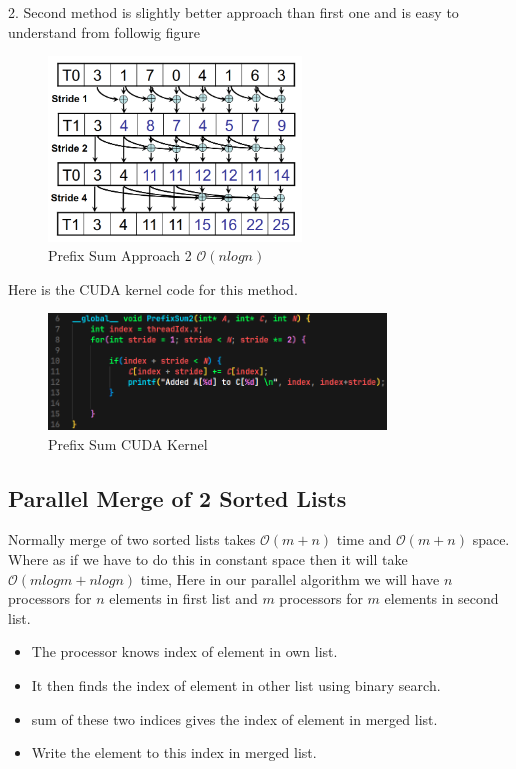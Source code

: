 \documentclass{article}
\begin{document}
2. Second method is slightly better approach than first one and is easy to understand from followig figure

\begin{figure}[h]
    \centering
    \includegraphics[width=0.6\textwidth]{Images/prefix2method.png}
    \caption{Prefix Sum Approach 2 $\mathcal{O}(nlogn)$}
\end{figure}

Here is the CUDA kernel code for this method.

\begin{figure}[h]
    \centering
    \includegraphics[width=0.8\textwidth]{Images/prefix2.png}
    \caption{Prefix Sum CUDA Kernel}
\end{figure}

\newpage
\subsection*{Parallel Merge of 2 Sorted Lists}
Normally merge of two sorted lists takes $\mathcal{O}(m+n)$ time and $\mathcal{O}(m+n)$ space. Where as if we have to do this in constant space then it will take $\mathcal{O}(mlogm + nlogn)$ time, Here in our parallel algorithm we will have $n$ processors for $n$ elements in first list and $m$ processors for $m$ elements in second list.

\begin{itemize}
    \item The processor knows index of element in own list.
    \item It then finds the index of element in other list using binary search.
    \item sum of these two indices gives the index of element in merged list.
    \item Write the element to this index in merged list.
\end{itemize}
\end{document}
